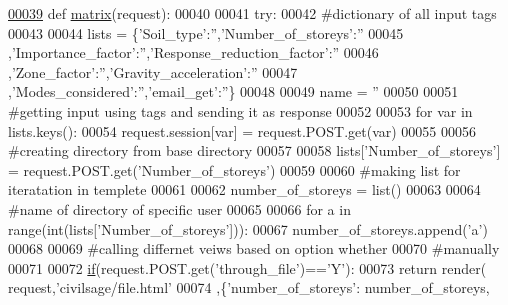 \begin{DoxyCode}
\hypertarget{namespacecivilsage_1_1views_l00039}{}\hyperlink{namespacecivilsage_1_1views_a8b58c93a9c82e84143c43dafaa744a4b}{00039} \textcolor{keyword}{def }\hyperlink{namespacecivilsage_1_1views_a8b58c93a9c82e84143c43dafaa744a4b}{matrix}(request):
00040 
00041     \textcolor{keywordflow}{try}:
00042         \textcolor{comment}{#dictionary of all input tags}
00043         
00044         lists = \{\textcolor{stringliteral}{'Soil\_type'}:\textcolor{stringliteral}{''},\textcolor{stringliteral}{'Number\_of\_storeys'}:\textcolor{stringliteral}{''}
00045         ,\textcolor{stringliteral}{'Importance\_factor'}:\textcolor{stringliteral}{''},\textcolor{stringliteral}{'Response\_reduction\_factor'}:\textcolor{stringliteral}{''}
00046         ,\textcolor{stringliteral}{'Zone\_factor'}:\textcolor{stringliteral}{''},\textcolor{stringliteral}{'Gravity\_acceleration'}:\textcolor{stringliteral}{''}
00047         ,\textcolor{stringliteral}{'Modes\_considered'}:\textcolor{stringliteral}{''},\textcolor{stringliteral}{'email\_get'}:\textcolor{stringliteral}{''}\}
00048 
00049         name = \textcolor{stringliteral}{''}
00050 
00051         \textcolor{comment}{#getting input using tags and sending it as response}
00052         
00053         \textcolor{keywordflow}{for} var \textcolor{keywordflow}{in} lists.keys():
00054             request.session[var] = request.POST.get(var)
00055 
00056         \textcolor{comment}{#creating directory from base directory}
00057         
00058         lists[\textcolor{stringliteral}{'Number\_of\_storeys'}] = request.POST.get(\textcolor{stringliteral}{'Number\_of\_storeys'})
00059 
00060         \textcolor{comment}{#making list for iteratation in templete}
00061         
00062         number\_of\_storeys = list()
00063         
00064         \textcolor{comment}{#name of directory of specific user}
00065         
00066         \textcolor{keywordflow}{for} a \textcolor{keywordflow}{in} range(int(lists[\textcolor{stringliteral}{'Number\_of\_storeys'}])):
00067             number\_of\_storeys.append(\textcolor{stringliteral}{'a'})
00068 
00069         \textcolor{comment}{#calling differnet veiws based on option whether}
00070         \textcolor{comment}{#manually}
00071 
00072         \hyperlink{bootstrap_8min_8js_ac2d69f5011896c6ed4a54e0dd36f6334}{if}(request.POST.get(\textcolor{stringliteral}{'through\_file'})==\textcolor{stringliteral}{'Y'}):
00073             \textcolor{keywordflow}{return} render( request,\textcolor{stringliteral}{'civilsage/file.html'}
00074             ,\{\textcolor{stringliteral}{'number\_of\_storeys'}: number\_of\_storeys,

\end{DoxyCode}
